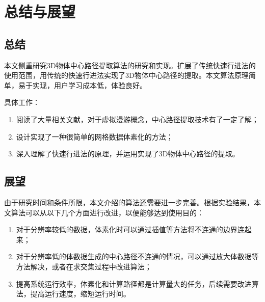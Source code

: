 \chapter*{总结与展望}
\section*{总结}
本文侧重研究3D物体中心路径提取算法的研究和实现。扩展了传统快速行进法的使用范围，用传统的快速行进法实现了3D物体中心路径的提取。本文算法原理简单，易于实现，用户学习成本低，体验良好。

具体工作：
\begin{enumerate}
    \item 阅读了大量相关文献，对于虚拟漫游概念，中心路径提取技术有了一定了解；
    \item 设计实现了一种很简单的网格数据体素化的方法；
    \item 深入理解了快速行进法的原理，并运用实现了3D物体中心路径的提取。
\end{enumerate}

\section*{展望}
由于研究时间和条件所限，本文介绍的算法还需要进一步完善。根据实验结果，本文算法可以从以下几个方面进行改进，以便能够达到使用目的：
\begin{enumerate}
    \item 对于分辨率较低的数据，体素化时可以通过插值等方法将不连通的边界连起来；
    \item 对于分辨率低的体数据生成的中心路径不连通的情况，可以通过放大体数据等方法解决，或者在求交集过程中改进算法；
    \item 提高系统运行效率，体素化和计算路径都是计算量大的任务，后续需要改进算法，提高运行速度，缩短运行时间。
\end{enumerate}

\cleardoublepage
